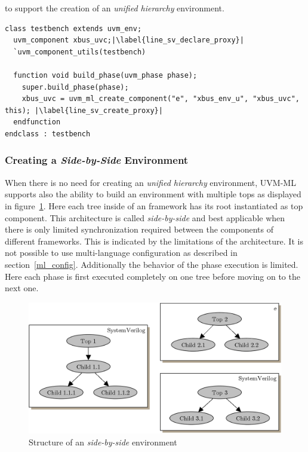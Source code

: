 to support the creation of an \emph{unified hierarchy} environment.
\medskip
\lstset{language=SystemVerilog, numbers = left, escapechar=|, breaklines=true}
\begin{lstlisting}[frame=htrbl, caption={SystemVerilog: instantiating an e unit}, label={lst:SV_unified_top}]
class testbench extends uvm_env;
  uvm_component xbus_uvc;|\label{line_sv_declare_proxy}|
  `uvm_component_utils(testbench)

  function void build_phase(uvm_phase phase);
    super.build_phase(phase);
    xbus_uvc = uvm_ml_create_component("e", "xbus_env_u", "xbus_uvc", this); |\label{line_sv_create_proxy}|
  endfunction
endclass : testbench
\end{lstlisting}

\subsubsection{Creating a \emph{Side-by-Side} Environment}

When there is no need for creating an \emph{unified hierarchy} environment, UVM-ML supports also the ability to build an
environment with multiple tops as displayed in figure~\ref{fig:UVM_ML_side_by_side}. Here each tree inside of an
framework has its root instantiated as top component. This architecture is called \emph{side-by-side} and best
applicable when there is only limited synchronization required between the components of different frameworks. This is
indicated by the limitations of the architecture. It is not possible to use multi-language configuration as described in
section~\ref{ml_config}. Additionally the behavior of the phase execution is limited. Here each phase is first executed
completely on one tree before moving on to the next one. 

\begin{figure}[htb]
 \centering
 \includegraphics[scale=0.3]{abb/UVM_ML_side_by_side}
 \caption{Structure of an \emph{side-by-side} environment}
\label{fig:UVM_ML_side_by_side}
\end{figure}

